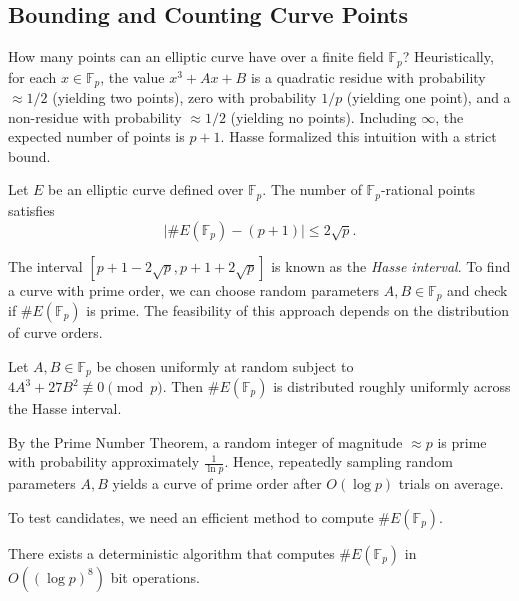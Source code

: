 \subsection*{Bounding and Counting Curve Points}

How many points can an elliptic curve have over a finite field \(\mathbb{F}_p\)?
Heuristically, for each \(x \in \mathbb{F}_p\), the value \(x^3 + Ax + B\) is a quadratic residue with probability \(\approx 1/2\) (yielding two points), zero with probability \(1/p\) (yielding one point), and a non-residue with probability \(\approx 1/2\) (yielding no points).
Including \(\infty\), the expected number of points is \(p + 1\).
Hasse formalized this intuition with a strict bound.

\begin{theorem}\label{thm:hasse}
    Let \(E\) be an elliptic curve defined over \(\mathbb{F}_p\). The number of \(\mathbb{F}_p\)-rational points satisfies
    \[
        \bigl| \#E(\mathbb{F}_p) - (p + 1) \bigr| \leq 2\sqrt{p}.
    \]
\end{theorem}

The interval \([p + 1 - 2\sqrt{p}, p + 1 + 2\sqrt{p}]\) is known as the \emph{Hasse interval}.
To find a curve with prime order, we can choose random parameters \(A, B \in \mathbb{F}_p\) and check if \(\#E(\mathbb{F}_p)\) is prime.
The feasibility of this approach depends on the distribution of curve orders.

\begin{theorem}\label{thm:lenstra}
    Let \(A, B \in \mathbb{F}_p\) be chosen uniformly at random subject to \(4A^3 + 27B^2 \not\equiv 0 \pmod{p}\).
    Then \(\#E(\mathbb{F}_p)\) is distributed roughly uniformly across the Hasse interval.
\end{theorem}

By the Prime Number Theorem, a random integer of magnitude \(\approx p\) is prime with probability approximately \(\frac{1}{\ln p}\).
Hence, repeatedly sampling random parameters \(A, B\) yields a curve of prime order after \(O(\log p)\) trials on average.

To test candidates, we need an efficient method to compute \(\#E(\mathbb{F}_p)\).

\begin{theorem}\label{thm:schoof}
    There exists a deterministic algorithm that computes \(\#E(\mathbb{F}_p)\) in \(O((\log p)^8)\) bit operations.
\end{theorem}

